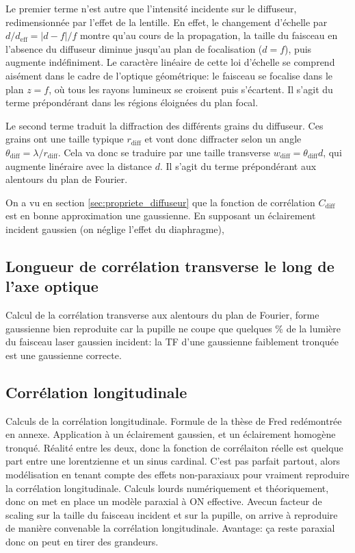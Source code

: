 Le premier terme n'est autre que l'intensité incidente sur le diffuseur, redimensionnée par l'effet de la lentille. En effet, le changement d'échelle par $d/d_{\mathrm{eff}}=\left| d-f \right| /f$ montre qu'au cours de la propagation, la taille du faisceau en l'absence du diffuseur diminue jusqu'au plan de focalisation ($d=f$), puis augmente indéfiniment. Le caractère linéaire de cette loi d'échelle se comprend aisément dans le cadre de l'optique géométrique: le faisceau se focalise dans le plan $z=f$, où tous les rayons lumineux se croisent puis s'écartent. Il s'agit du terme prépondérant dans les régions éloignées du plan focal.

Le second terme traduit la diffraction des différents grains du diffuseur. Ces grains ont une taille typique $r_{\mathrm{diff}}$ et vont donc diffracter selon un angle $\theta_{\mathrm{diff}}=\lambda/r_{\mathrm{diff}}$. Cela va donc se traduire par une taille transverse $w_{\mathrm{diff}}=\theta_{\mathrm{diff}} d$, qui augmente linéraire avec la distance $d$. Il s'agit du terme prépondérant aux alentours du plan de Fourier. 

On a vu en section \ref{sec:propriete_diffuseur} que la fonction de corrélation $C_{\mathrm{diff}}$ est en bonne approximation une gaussienne. En supposant un éclairement incident gaussien (on néglige l'effet du diaphragme), 

\subsection{Longueur de corrélation transverse le long de l'axe optique}
Calcul de la corrélation transverse aux alentours du plan de Fourier, forme gaussienne bien reproduite car la pupille ne coupe que quelques \% de la lumière du faisceau laser gaussien incident: la TF d'une gaussienne faiblement tronquée est une gaussienne correcte.

\subsection{Corrélation longitudinale}
Calculs de la corrélation longitudinale. Formule de la thèse de Fred redémontrée en annexe. Application à un éclairement gaussien, et un éclairement homogène tronqué. Réalité entre les deux, donc la fonction de corrélaiton réelle est quelque part entre une lorentzienne et un sinus cardinal. C'est pas parfait partout, alors modélisation en tenant compte des effets non-paraxiaux pour vraiment reproduire la corrélation longitudinale. Calculs lourds numériquement et théoriquement, donc on met en place un modèle paraxial à ON effective. Avecun facteur de scaling sur la taille du faisceau incident et sur la pupille, on arrive à reproduire de manière convenable la corrélation longitudinale. Avantage: ça reste paraxial donc on peut en tirer des grandeurs. 

